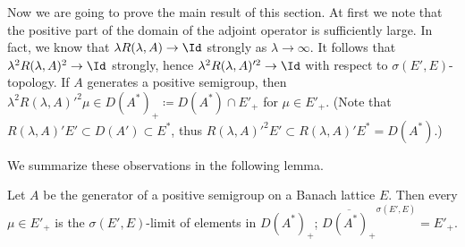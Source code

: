 Now we are going to prove the main result of this section. 
At first we note that the positive part of the domain of the adjoint operator is sufficiently large. 
In fact, we know that $\lambda R(\lambda,A) \to \Id $ strongly as $\lambda \to \infty$. 
It follows that $\lambda^2R(\lambda,A)^2 \to \Id $ strongly, hence $\lambda^2R(\lambda,A)'^2 \to \Id $ with respect to $\sigma(E',E)$-topology. 
If\/ $A$ generates a positive semigroup, then $\lambda^2R(\lambda,A)'^2\mu \in D(A^*)_{+} \coloneq D(A^*)\cap E'_{+}$ for $\mu \in E'_+$. 
(Note that $R(\lambda,A)'E' \subset D(A') \subset E^*$, thus $R(\lambda,A)'^2E' \subset R(\lambda,A)'E^* = D(A^*)$.)

We summarize these observations in the following lemma.

\begin{lemma}\label{lem:b4-1.3}%
Let $A$ be the generator of a positive semigroup on a Banach lattice $E$. Then every $\mu \in E'_+$ is the $\sigma(E',E)$-limit of elements in $D(A^*)_{+}$; \ie $\overline{D(A^*)_+}^{\sigma(E',E)} = E'_+$.
\end{lemma}

